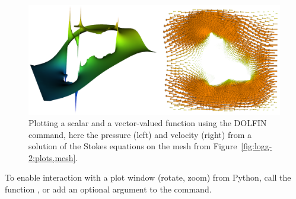 \begin{figure}
\bwfig
\centering
  \includegraphics[width=\largefig]{chapters/logg-2/png/plots.png}
    \caption{Plotting a scalar and a vector-valued function using the
    DOLFIN  command, here the pressure (left) and velocity
    (right) from a solution of the Stokes equations on the mesh from
    Figure~\ref{fig:logg-2:plots,mesh}.}
  \label{fig:logg-2:plots,function}
\end{figure}

To enable interaction with a plot window (rotate, zoom) from Python,
call the function , or add an optional argument
 to the  command.


